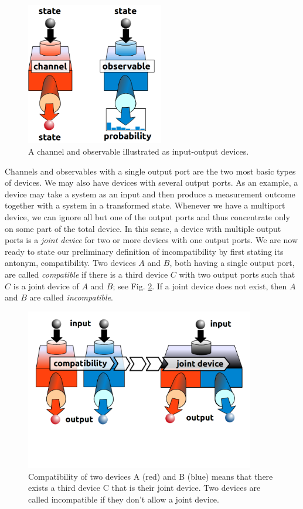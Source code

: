 \documentclass[12pt]{article}
\theoremstyle{definition}
\begin{document}
\begin{figure}\begin{center}
\includegraphics[width=6cm]{fig_devices.png}
\caption{A channel and observable illustrated as input-output devices.}
\label{fig:basic}
\end{center}
\end{figure}

Channels and observables with a single output port are the two most basic types of devices.
We may also have devices with several output ports.
As an example, a device may take a system as an input and then produce a measurement outcome together with a system in a transformed state. 
Whenever we have a multiport device, we can ignore all but one of the output ports and thus concentrate only on some part of the total device.
In this sense, a device with multiple output ports is a \emph{joint device} for two or more devices with one output ports.
We are now ready to state our preliminary definition of incompatibility by first stating its antonym, compatibility.
Two devices $A$ and $B$, both having a single output port, are called \emph{compatible} if there is a third device $C$ with two output ports such that $C$ is a joint device of $A$ and $B$; see Fig. \ref{fig:existence}.
If a joint device does not exist, then $A$ and $B$ are called \emph{incompatible}.

\begin{figure}\begin{center}
\includegraphics[width=10cm]{fig_incom.png}
\caption{Compatibility of two devices A (red) and B (blue) means that there exists a third device C that is their joint device.
Two devices are called incompatible if they don't allow a joint device.}
\label{fig:existence}
\end{center}
\end{figure}
\end{document}
